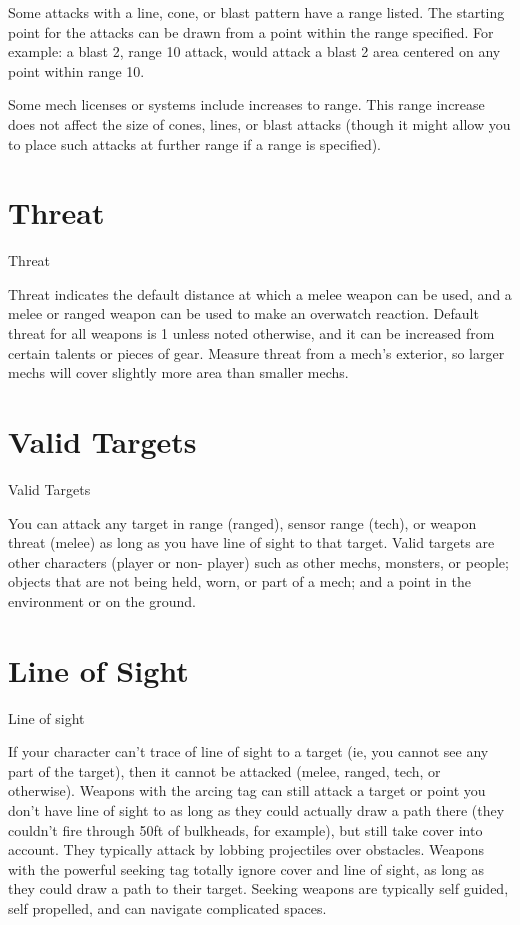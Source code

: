 Some attacks with a line, cone, or blast pattern have a range listed. The starting point for the  
attacks can be drawn from a point within the range specified. For example: a blast 2, range 10  
attack, would attack a blast 2 area centered on any point within range 10.  

Some mech licenses or systems include increases to range. This range increase does not affect  
the size of cones, lines, or blast attacks (though it might allow you to place such attacks at further  
range if a range is specified).  
\section{Threat}
                                                     Threat  

Threat indicates the default distance at which a melee weapon can be used, and a melee or  
ranged weapon can be used to make an overwatch reaction. Default threat for all weapons is 1  
unless noted otherwise, and it can be increased from certain talents or pieces of gear. Measure  
threat from a mech’s exterior, so larger mechs will cover slightly more area than smaller mechs.  
\section{Valid Targets}
                                                Valid Targets  

You can attack any target in range (ranged), sensor range (tech), or weapon threat (melee) as  
long as you have line of sight to that target. Valid targets are other characters (player or non- 
player) such as other mechs, monsters, or people; objects that are not being held, worn, or part of  
a mech; and a point in the environment or on the ground.  
\section{Line of Sight}
                                                Line of sight  

If your character can’t trace of line of sight to a target (ie, you cannot see any part of the target),  
then it cannot be attacked (melee, ranged, tech, or otherwise). Weapons with the arcing tag can  
still attack a target or point you don’t have line of sight to as long as they could actually draw a  
path there (they couldn’t fire through 50ft of bulkheads, for example), but still take cover into  
account. They typically attack by lobbing projectiles over obstacles. Weapons with the powerful  
seeking tag totally ignore cover and line of sight, as long as they could draw a path to their  
target. Seeking weapons are typically self guided, self propelled, and can navigate complicated  
spaces.
 

